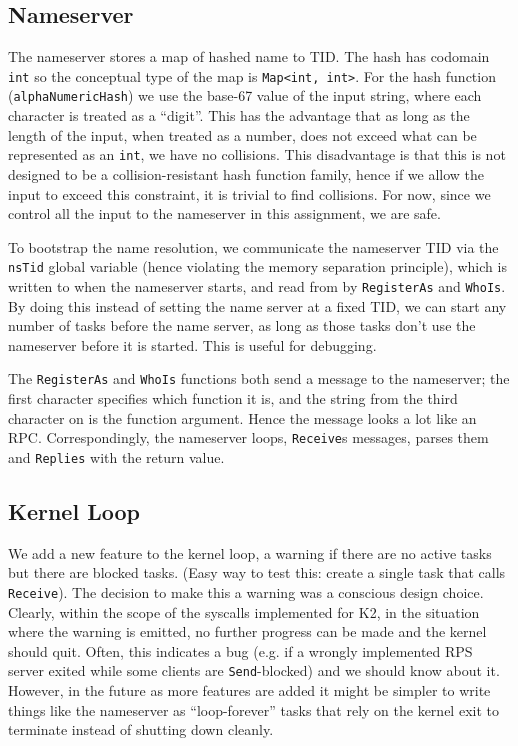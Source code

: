 \documentclass{article}
\begin{document}
\subsection*{Nameserver}

The nameserver stores a map of hashed name to TID. The hash has codomain \texttt{int} so the conceptual type of the map is \texttt{Map<int, int>}. For the hash function (\texttt{alphaNumericHash}) we use the base-67 value of the input string, where each character is treated as a ``digit''. This has the advantage that as long as the length of the input, when treated as a number, does not exceed what can be represented as an \texttt{int}, we have no collisions. This disadvantage is that this is not designed to be a collision-resistant hash function family, hence if we allow the input to exceed this constraint, it is trivial to find collisions. For now, since we control all the input to the nameserver in this assignment, we are safe.

To bootstrap the name resolution, we communicate the nameserver TID via the \texttt{nsTid} global variable (hence violating the memory separation principle), which is written to when the nameserver starts, and read from by \texttt{RegisterAs} and \texttt{WhoIs}. By doing this instead of setting the name server at a fixed TID, we can start any number of tasks before the name server, as long as those tasks don't use the nameserver before it is started. This is useful for debugging.

The \texttt{RegisterAs} and \texttt{WhoIs} functions both send a message to the nameserver; the first character specifies which function it is, and the string from the third character on is the function argument. Hence the message looks a lot like an RPC. Correspondingly, the nameserver loops, \texttt{Receive}s messages, parses them and \texttt{Replies} with the return value.

\subsection*{Kernel Loop}

We add a new feature to the kernel loop, a warning if there are no active tasks but there are blocked tasks. (Easy way to test this: create a single task that calls \texttt{Receive}). The decision to make this a warning was a conscious design choice. Clearly, within the scope of the syscalls implemented for K2, in the situation where the warning is emitted, no further progress can be made and the kernel should quit. Often, this indicates a bug (e.g. if a wrongly implemented RPS server exited while some clients are \texttt{Send}-blocked) and we should know about it. However, in the future as more features are added it might be simpler to write things like the nameserver as ``loop-forever'' tasks that rely on the kernel exit to terminate instead of shutting down cleanly.
\end{document}
